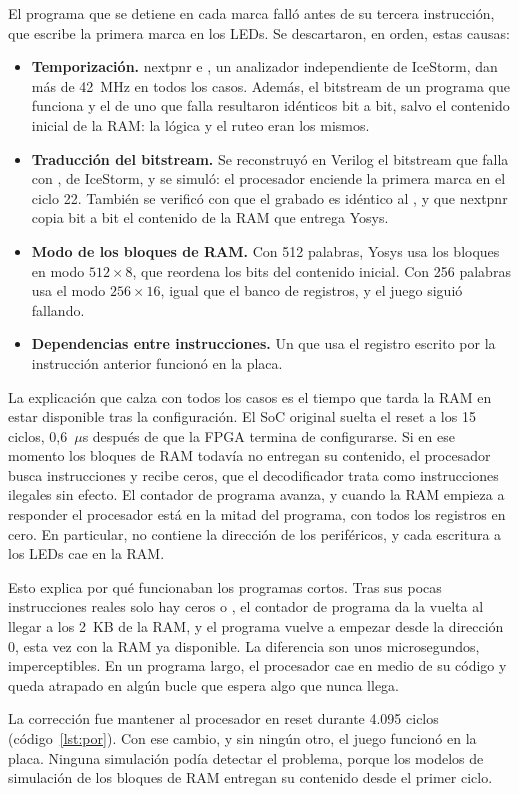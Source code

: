 El programa que se detiene en cada marca falló antes de su tercera instrucción, que
escribe la primera marca en los LEDs. Se descartaron, en orden, estas causas:

\begin{itemize}
  \item \textbf{Temporización.} nextpnr e , un analizador independiente de
        IceStorm, dan más de 42~MHz en todos los casos. Además, el bitstream de un
        programa que funciona y el de uno que falla resultaron idénticos bit a bit,
        salvo el contenido inicial de la RAM: la lógica y el ruteo eran los mismos.
  \item \textbf{Traducción del bitstream.} Se reconstruyó en Verilog el bitstream que
        falla con , de IceStorm, y se simuló: el procesador enciende
        la primera marca en el ciclo 22. También se verificó con  que el
         grabado es idéntico al , y que nextpnr copia bit a bit el
        contenido de la RAM que entrega Yosys.
  \item \textbf{Modo de los bloques de RAM.} Con 512 palabras, Yosys usa los bloques en
        modo $512\times8$, que reordena los bits del contenido inicial. Con 256 palabras
        usa el modo $256\times16$, igual que el banco de registros, y el juego siguió
        fallando.
  \item \textbf{Dependencias entre instrucciones.} Un  que usa el registro
        escrito por la instrucción anterior funcionó en la placa.
\end{itemize}

La explicación que calza con todos los casos es el tiempo que tarda la RAM en estar
disponible tras la configuración. El SoC original suelta el reset a los 15 ciclos,
0,6~$\mu$s después de que la FPGA termina de configurarse. Si en ese momento los bloques
de RAM todavía no entregan su contenido, el procesador busca instrucciones y recibe
ceros, que el decodificador trata como instrucciones ilegales sin efecto. El contador
de programa avanza, y cuando la RAM empieza a responder el procesador está en la mitad
del programa, con todos los registros en cero. En particular,  no contiene la
dirección de los periféricos, y cada escritura a los LEDs cae en la RAM.

Esto explica por qué funcionaban los programas cortos. Tras sus pocas instrucciones
reales solo hay ceros o , el contador de programa da la vuelta al llegar a
los 2~KB de la RAM, y el programa vuelve a empezar desde la dirección 0, esta vez con la
RAM ya disponible. La diferencia son unos microsegundos, imperceptibles. En un programa
largo, el procesador cae en medio de su código y queda atrapado en algún bucle que
espera algo que nunca llega.

La corrección fue mantener al procesador en reset durante 4.095 ciclos
(código~\ref{lst:por}). Con ese cambio, y sin ningún otro, el juego funcionó en la placa.
Ninguna simulación podía detectar el problema, porque los modelos de simulación de los
bloques de RAM entregan su contenido desde el primer ciclo.
